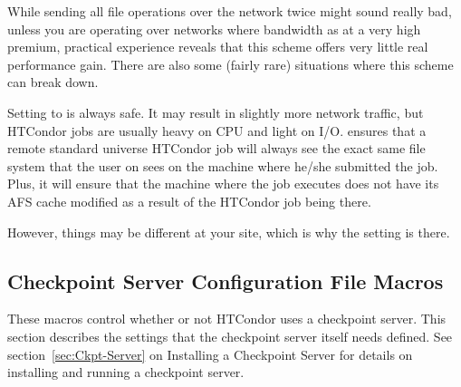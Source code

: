 \begin{description}
  While sending all file operations over the network twice might sound
  really bad, unless you are operating over networks where bandwidth
  as at a very high premium, practical experience reveals that this
  scheme offers very little real performance gain.  There are also
  some (fairly rare) situations where this scheme can break down.
  
  Setting  to  is always safe.  It may result
  in slightly more network traffic, but HTCondor jobs are usually heavy
  on CPU and light on I/O.   ensures that a remote
  standard universe HTCondor job will always see the exact same
  file system that the user on sees on the machine where he/she
  submitted the job.  Plus, it will ensure that the machine where the
  job executes does not have its AFS cache modified as a result of
  the HTCondor job being there.  
  
  However, things may be different at your site, which is why the
  setting is there.

\end{description}

\subsection{\label{sec:Checkpoint-Server-Config-File-Entries}Checkpoint Server Configuration File Macros} 

These macros control whether or not HTCondor uses a checkpoint server.
This section
describes the settings that the checkpoint server itself needs defined. 
See section~\ref{sec:Ckpt-Server} on Installing a Checkpoint Server
for details on installing and running a checkpoint server.

